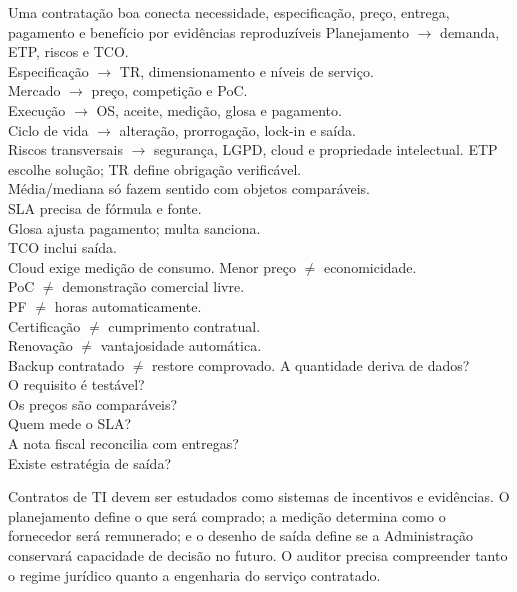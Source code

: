 {Uma contratação boa conecta necessidade, especificação, preço, entrega, pagamento e benefício por evidências reproduzíveis}
{Planejamento $\rightarrow$ demanda, ETP, riscos e TCO.\\Especificação $\rightarrow$ TR, dimensionamento e níveis de serviço.\\Mercado $\rightarrow$ preço, competição e PoC.\\Execução $\rightarrow$ OS, aceite, medição, glosa e pagamento.\\Ciclo de vida $\rightarrow$ alteração, prorrogação, lock-in e saída.\\Riscos transversais $\rightarrow$ segurança, LGPD, cloud e propriedade intelectual.}
{ETP escolhe solução; TR define obrigação verificável.\\Média/mediana só fazem sentido com objetos comparáveis.\\SLA precisa de fórmula e fonte.\\Glosa ajusta pagamento; multa sanciona.\\TCO inclui saída.\\Cloud exige medição de consumo.}
{Menor preço $\neq$ economicidade.\\PoC $\neq$ demonstração comercial livre.\\PF $\neq$ horas automaticamente.\\Certificação $\neq$ cumprimento contratual.\\Renovação $\neq$ vantajosidade automática.\\Backup contratado $\neq$ restore comprovado.}
{A quantidade deriva de dados?\\O requisito é testável?\\Os preços são comparáveis?\\Quem mede o SLA?\\A nota fiscal reconcilia com entregas?\\Existe estratégia de saída?}

\begin{resumo}
Contratos de TI devem ser estudados como sistemas de incentivos e evidências. O planejamento define o que será comprado; a medição determina como o fornecedor será remunerado; e o desenho de saída define se a Administração conservará capacidade de decisão no futuro. O auditor precisa compreender tanto o regime jurídico quanto a engenharia do serviço contratado.
\end{resumo}
